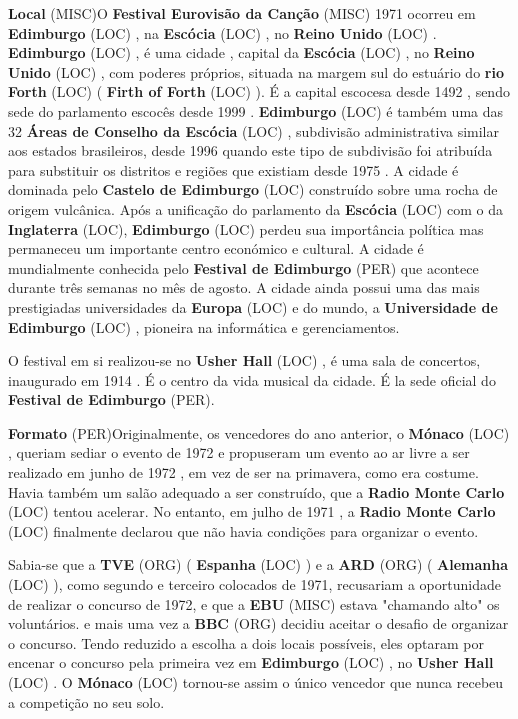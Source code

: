 \documentclass[12pt,a4paper]{article}
\begin{document}
\textbf{Local} (MISC)O \textbf{Festival Eurovisão da Canção} (MISC) 1971 ocorreu em \textbf{Edimburgo} (LOC) , na \textbf{Escócia} (LOC) , no \textbf{Reino Unido} (LOC) . \textbf{Edimburgo} (LOC) , é uma cidade , capital da \textbf{Escócia} (LOC) , no \textbf{Reino Unido} (LOC) , com poderes próprios, situada na margem sul do estuário do \textbf{rio Forth} (LOC) ( \textbf{Firth of Forth} (LOC) ). É a capital escocesa desde 1492 , sendo sede do parlamento escocês desde 1999 . \textbf{Edimburgo} (LOC) é também uma das 32 \textbf{Áreas de Conselho da Escócia} (LOC) , subdivisão administrativa similar aos estados brasileiros, desde 1996 quando este tipo de subdivisão foi atribuída para substituir os distritos e regiões que existiam desde 1975 . A cidade é dominada pelo \textbf{Castelo de Edimburgo} (LOC) construído sobre uma rocha de origem vulcânica. Após a unificação do parlamento da \textbf{Escócia} (LOC) com o da \textbf{Inglaterra} (LOC), \textbf{Edimburgo} (LOC) perdeu sua importância política mas permaneceu um importante centro económico e cultural. A cidade é mundialmente conhecida pelo \textbf{Festival de Edimburgo} (PER) que acontece durante três semanas no mês de agosto. A cidade ainda possui uma das mais prestigiadas universidades da \textbf{Europa} (LOC) e do mundo, a \textbf{Universidade de Edimburgo} (LOC) , pioneira na informática e gerenciamentos.

O festival em si realizou-se no \textbf{Usher Hall} (LOC) , é uma sala de concertos, inaugurado em 1914 . É o centro da vida musical da cidade. É la sede oficial do \textbf{Festival de Edimburgo} (PER).



\textbf{Formato} (PER)Originalmente, os vencedores do ano anterior, o \textbf{Mónaco} (LOC) , queriam sediar o evento de 1972 e propuseram um evento ao ar livre a ser realizado em junho de 1972 , em vez de ser na primavera, como era costume. Havia também um salão adequado a ser construído, que a \textbf{Radio Monte Carlo} (LOC) tentou acelerar. No entanto, em julho de 1971 , a \textbf{Radio Monte Carlo} (LOC) finalmente declarou que não havia condições para organizar o evento.

Sabia-se que a \textbf{TVE} (ORG) ( \textbf{Espanha} (LOC) ) e a \textbf{ARD} (ORG) ( \textbf{Alemanha} (LOC) ), como segundo e terceiro colocados de 1971, recusariam a oportunidade de realizar o concurso de 1972, e que a \textbf{EBU} (MISC) estava "chamando alto" os voluntários. e mais uma vez a \textbf{BBC} (ORG) decidiu aceitar o desafio de organizar o concurso. Tendo reduzido a escolha a dois locais possíveis, eles optaram por encenar o concurso pela primeira vez em \textbf{Edimburgo} (LOC) , no \textbf{Usher Hall} (LOC) . O \textbf{Mónaco} (LOC) tornou-se assim o único vencedor que nunca recebeu a competição no seu solo.
\end{document}

